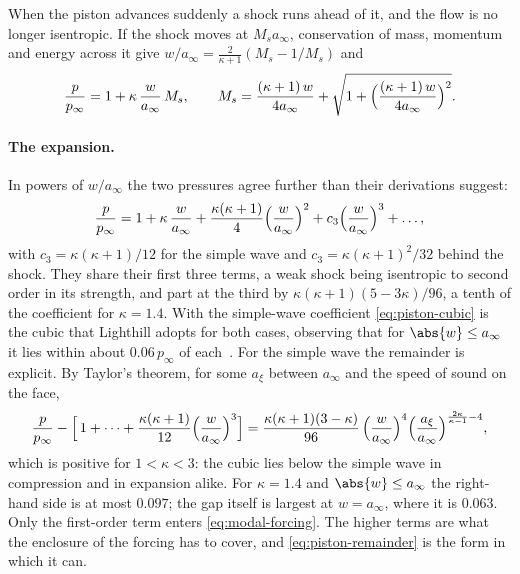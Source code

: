When the piston advances suddenly a shock runs ahead of it, and the flow is
no longer isentropic. If the shock moves at $M_s a_\infty$, conservation of
mass, momentum and energy across it give
$w/a_\infty = \tfrac{2}{\kappa+1}(M_s - 1/M_s)$ and
\begin{equation}\label{eq:piston-shock}
  \frac{p}{p_\infty} = 1 + \kappa\,\frac{w}{a_\infty}\,M_s ,
  \qquad
  M_s = \frac{(\kappa+1)\,w}{4a_\infty}
        + \sqrt{1 + \Bigl(\frac{(\kappa+1)\,w}{4a_\infty}\Bigr)^{2}} .
\end{equation}

\paragraph{The expansion.}
In powers of $w/a_\infty$ the two pressures agree further than their
derivations suggest:
\begin{equation}\label{eq:piston-cubic}
  \frac{p}{p_\infty}
  = 1 + \kappa\,\frac{w}{a_\infty}
    + \frac{\kappa(\kappa+1)}{4}\Bigl(\frac{w}{a_\infty}\Bigr)^{2}
    + c_3\Bigl(\frac{w}{a_\infty}\Bigr)^{3} + \dots,
\end{equation}
with $c_3 = \kappa(\kappa+1)/12$ for the simple wave and
$c_3 = \kappa(\kappa+1)^2/32$ behind the shock.
They share their first three terms, a weak shock being isentropic to second
order in its strength, and part at the third by
$\kappa(\kappa+1)(5-3\kappa)/96$, a tenth of the coefficient for
$\kappa = 1.4$. With the simple-wave coefficient \cref{eq:piston-cubic} is
the cubic that Lighthill adopts for both cases, observing that for
$\abs{w}\le a_\infty$ it lies within about $0.06\,p_\infty$ of
each~\cite{lighthill1953oscillating}. For the simple wave the remainder is
explicit. By Taylor's theorem, for some $a_\xi$ between $a_\infty$ and the
speed of sound on the face,
\begin{equation}\label{eq:piston-remainder}
  \frac{p}{p_\infty} - \Bigl[\,1 + \dots + \frac{\kappa(\kappa+1)}{12}
      \Bigl(\frac{w}{a_\infty}\Bigr)^{3}\Bigr]
  = \frac{\kappa(\kappa+1)(3-\kappa)}{96}\,
    \Bigl(\frac{w}{a_\infty}\Bigr)^{4}
    \Bigl(\frac{a_\xi}{a_\infty}\Bigr)^{\frac{2\kappa}{\kappa-1}-4} ,
\end{equation}
which is positive for $1<\kappa<3$: the cubic lies below the simple wave in
compression and in expansion alike. For $\kappa = 1.4$ and
$\abs{w}\le a_\infty$ the right-hand side is at most $0.097$; the gap
itself is largest at $w = a_\infty$, where it is $0.063$. Only the
first-order term enters \cref{eq:modal-forcing}. The higher terms are what
the enclosure of the forcing has to cover, and \cref{eq:piston-remainder} is
the form in which it can.

